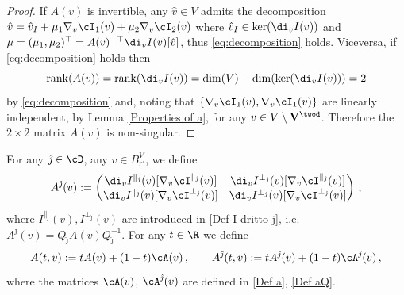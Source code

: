 \documentclass[11pt,a4paper,reqno]{article}
\DeclareMathOperator{\rank}{rank}
\numberwithin{equation}{section}
\theoremstyle{definition}
\begin{document}
    \begin{proof}
     If  $A(v)$ is invertible,
 any  $\hat v\in V$ admits the decomposition 
        $
            \hat v=\hat v_I+\mu_1\nabla_v\cI_1(v)+\mu_2\nabla_v\cI_2(v)
        $
        where $\hat v_I\in \ker(\di_v I(v) )$ and $\mu=(\mu_1,\mu_2)^\top   = A(v)^{- \top} \di_vI(v)[\hat v]$, thus   \eqref{eq:decomposition} holds.
       Viceversa,  if  \eqref{eq:decomposition} holds then 
        $$
    \rank (A(v)) = \rank(\di_vI(v))=\dim(V)-\dim(\ker(\di_v I(v)))  = 2
        $$ 
by \eqref{eq:decomposition} and, noting that $\{\nabla_v\cI_1(v),\nabla_v \cI_1(v)\}$ are linearly independent, by  Lemma \ref{Properties of a}, for   any $v\in V\setminus {\bf V}^{\twod}$. Therefore the $ 2 \times 2 $ matrix $A(v)$ is non-singular.
    \end{proof}



For any $ \hat \jmath \in \cD $, any $ v \in B_{r'}^V $, we define 
    \begin{equation}\label{Def AAQ} 
        A^{\hat \jmath}(v):=
        \begin{pmatrix} 
            \di_vI^{\parallel_{\hat \jmath}}(v)[\nabla_v \cI^{\parallel_{\hat \jmath}}(v)] & \di_vI^{\bot_{\hat \jmath}}(v)[\nabla_v \cI^{\parallel_{\hat \jmath}}(v)] \\
            \di_vI^{\parallel_{\hat \jmath}}(v)[\nabla_v \cI^{\bot_{\hat \jmath}}(v)] & \di_vI^{\bot_{\hat \jmath}}(v)[\nabla_v \cI^{\bot_{\hat \jmath}}(v)]
        \end{pmatrix}
        \, , 
    \end{equation}
   where $ I^{\parallel_{\hat \jmath}}(v), I^{\bot_{\hat \jmath}}(v) $
   are introduced  in 
   \eqref{Def I dritto j},  i.e. $A^{\hat \jmath}(v)=Q_{\hat \jmath} A(v) Q_{\hat \jmath}^{-1}$.  For any $ t \in \R $ we define  
    \begin{equation}\label{eq:def At}
        A(t,v):=tA(v)+(1-t)\cA(v) \, , \qquad A^{\hat \jmath}(t,v):=tA^{\hat \jmath}(v)+(1-t)\cA^{\hat \jmath}(v)\, , 
    \end{equation}
where the matrices $ \cA(v) $, $\cA^{\hat \jmath}(v)$ are  defined in \eqref{Def a}, \eqref{Def aQ}.
    
\end{document}
